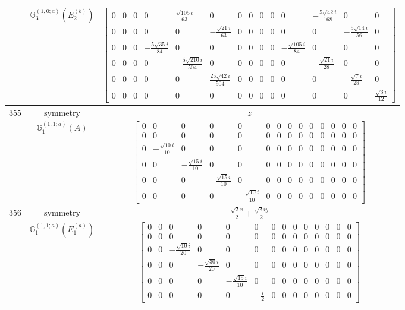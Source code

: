 \documentclass[fleqn,8pt,landscape]{jsarticle}
\begin{document}
\begin{longtable}{ccc}
$  $ & $ \mathbb{G}_{3}^{(1,0;a)}(E_{2}^{(b)}) $ & $ \begin{bmatrix} 0 & 0 & 0 & 0 & \frac{\sqrt{105} i}{63} & 0 & 0 & 0 & 0 & 0 & 0 & - \frac{5 \sqrt{42} i}{168} & 0 & 0 \\ 0 & 0 & 0 & 0 & 0 & - \frac{\sqrt{21} i}{63} & 0 & 0 & 0 & 0 & 0 & 0 & - \frac{5 \sqrt{14} i}{56} & 0 \\ 0 & 0 & 0 & - \frac{5 \sqrt{35} i}{84} & 0 & 0 & 0 & 0 & 0 & 0 & - \frac{\sqrt{105} i}{84} & 0 & 0 & 0 \\ 0 & 0 & 0 & 0 & - \frac{5 \sqrt{210} i}{504} & 0 & 0 & 0 & 0 & 0 & 0 & - \frac{\sqrt{21} i}{28} & 0 & 0 \\ 0 & 0 & 0 & 0 & 0 & \frac{25 \sqrt{42} i}{504} & 0 & 0 & 0 & 0 & 0 & 0 & - \frac{\sqrt{7} i}{28} & 0 \\ 0 & 0 & 0 & 0 & 0 & 0 & 0 & 0 & 0 & 0 & 0 & 0 & 0 & \frac{\sqrt{3} i}{12} \end{bmatrix} $ \\ \hline
$ 355 $ & $ \text{symmetry} $ & $ z $ \\
$  $ & $ \mathbb{G}_{1}^{(1,1;a)}(A) $ & $ \begin{bmatrix} 0 & 0 & 0 & 0 & 0 & 0 & 0 & 0 & 0 & 0 & 0 & 0 & 0 & 0 \\ 0 & 0 & 0 & 0 & 0 & 0 & 0 & 0 & 0 & 0 & 0 & 0 & 0 & 0 \\ 0 & - \frac{\sqrt{10} i}{10} & 0 & 0 & 0 & 0 & 0 & 0 & 0 & 0 & 0 & 0 & 0 & 0 \\ 0 & 0 & - \frac{\sqrt{15} i}{10} & 0 & 0 & 0 & 0 & 0 & 0 & 0 & 0 & 0 & 0 & 0 \\ 0 & 0 & 0 & - \frac{\sqrt{15} i}{10} & 0 & 0 & 0 & 0 & 0 & 0 & 0 & 0 & 0 & 0 \\ 0 & 0 & 0 & 0 & - \frac{\sqrt{10} i}{10} & 0 & 0 & 0 & 0 & 0 & 0 & 0 & 0 & 0 \end{bmatrix} $ \\ \hline
$ 356 $ & $ \text{symmetry} $ & $ \frac{\sqrt{2} x}{2} + \frac{\sqrt{2} i y}{2} $ \\
$  $ & $ \mathbb{G}_{1}^{(1,1;a)}(E_{1}^{(a)}) $ & $ \begin{bmatrix} 0 & 0 & 0 & 0 & 0 & 0 & 0 & 0 & 0 & 0 & 0 & 0 & 0 & 0 \\ 0 & 0 & 0 & 0 & 0 & 0 & 0 & 0 & 0 & 0 & 0 & 0 & 0 & 0 \\ 0 & 0 & - \frac{\sqrt{10} i}{20} & 0 & 0 & 0 & 0 & 0 & 0 & 0 & 0 & 0 & 0 & 0 \\ 0 & 0 & 0 & - \frac{\sqrt{30} i}{20} & 0 & 0 & 0 & 0 & 0 & 0 & 0 & 0 & 0 & 0 \\ 0 & 0 & 0 & 0 & - \frac{\sqrt{15} i}{10} & 0 & 0 & 0 & 0 & 0 & 0 & 0 & 0 & 0 \\ 0 & 0 & 0 & 0 & 0 & - \frac{i}{2} & 0 & 0 & 0 & 0 & 0 & 0 & 0 & 0 \end{bmatrix} $ \\ \hline

\end{longtable}
\end{document}
